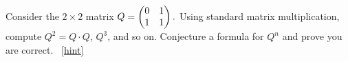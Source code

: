 \documentclass{book}
\begin{document}
\setcounter{project}{156}
\addtocounter{project}{-1}
\begin{activity}[]\label{fib-matrix}
\hypertarget{p-1009}{}%
Consider the \(2\times 2\) matrix \(Q =
\begin{pmatrix}
0 & 1\\
1 & 1
\end{pmatrix}.\) Using standard matrix multiplication, compute \(Q^2 = Q\cdot Q\), \(Q^3\), and so on.  Conjecture a formula for \(Q^n\) and prove you are correct.%
~\hfill{\tiny\hyperlink{a-156}{[hint]}\hypertarget{q-156}{}}\end{activity}
\end{document}
